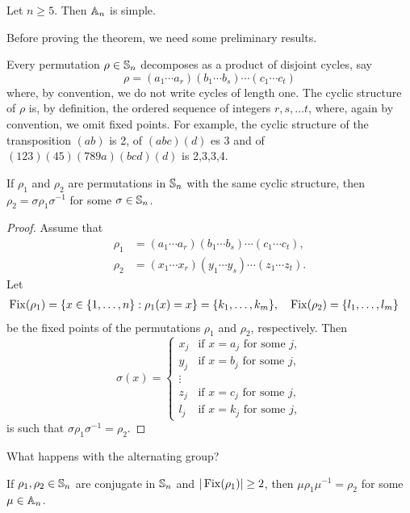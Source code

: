 \begin{theorem}[Jordan]
\label{thm:Jordan}
    Let $n\geq5$. Then $\mathbb{A}_n$ is simple. 
\end{theorem}

Before proving the theorem, we need some preliminary results.

Every permutation $\rho\in\mathbb{S}_n$ decomposes as a product of disjoint cycles, say
\[
\rho=(a_1\cdots a_r)(b_1\cdots b_s)\cdots (c_1\cdots c_t)
\]
where, by convention, we do not write cycles of length one. 
The cyclic structure of $\rho$ is, by definition, the ordered 
sequence of integers $r,s,\dots t$, where, again by convention,  
we omit fixed points. For example, the cyclic structure of 
the transposition $(ab)$ is 2, 
of $(abc)(d)$ es 3 and of $(123)(45)(789a)(bcd)(d)$ is 2,3,3,4. 

\begin{lemma}
If $\rho_1$ and $\rho_2$ are permutations in $\mathbb{S}_n$ with the same
cyclic structure, then 
$\rho_2=\sigma\rho_1\sigma^{-1}$ for some
$\sigma\in\mathbb{S}_n$. 
\end{lemma}

\begin{proof}
Assume that 
\begin{align*}
\rho_1&=(a_1\cdots a_r)(b_1\cdots b_s)\cdots (c_1\cdots c_t),\\
\rho_2&=(x_1\cdots x_r)(y_1\cdots y_s)\cdots (z_1\cdots z_t).
\end{align*}
Let  
\begin{align*}
\operatorname{Fix}(\rho_1) &= \{x\in\{1,\dots,n\}:\rho_1(x)=x\}=\{k_1,\dots,k_m\},&&
\operatorname{Fix}(\rho_2)=\{l_1,\dots,l_m\}	
\end{align*}
be the fixed points of the permutations $\rho_1$ and $\rho_2$,
respectively. Then 
\[
\sigma(x)=\begin{cases}
x_j & \text{if $x=a_j$ for some $j$},\\
y_j & \text{if $x=b_j$ for some $j$},\\
\vdots\\
z_j & \text{if $x=c_j$ for some $j$},\\
l_j & \text{if $x=k_j$ for some $j$},	
\end{cases}
\]
is such that $\sigma\rho_1\sigma^{-1}=\rho_2$. 
\end{proof}

What happens with the alternating group? 

\begin{lemma}
If $\rho_1,\rho_2\in\mathbb{S}_n$ are conjugate in $\mathbb{S}_n$ and  $|\operatorname{Fix}(\rho_1)|\geq2$, then 
$\mu\rho_1\mu^{-1}=\rho_2$ for some $\mu\in\mathbb{A}_n$.  
\end{lemma}

